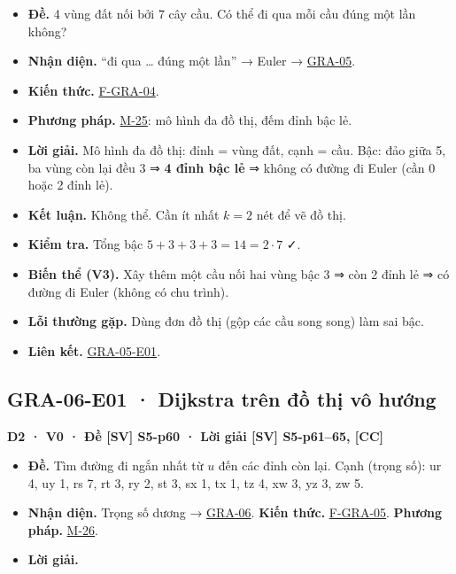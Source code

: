 \documentclass[
  10pt,
  twoside,openany]{book}
\providecommand{\tightlist}{%
  \setlength{\itemsep}{0pt}\setlength{\parskip}{0pt}}
\begin{document}
\begin{itemize}
\tightlist
\item
  \textbf{Đề.} 4 vùng đất nối bởi 7 cây cầu. Có thể đi qua mỗi cầu đúng
  một lần không?
\item
  \textbf{Nhận diện.} ``đi qua \ldots{} đúng một lần'' → Euler →
  \protect\hyperlink{GRA-05}{GRA-05}.
\item
  \textbf{Kiến thức.} \protect\hyperlink{F-GRA-04}{F-GRA-04}.
\item
  \textbf{Phương pháp.} \protect\hyperlink{M-25}{M-25}: mô hình đa đồ
  thị, đếm đỉnh bậc lẻ.
\item
  \textbf{Lời giải.} Mô hình đa đồ thị: đỉnh = vùng đất, cạnh = cầu.
  Bậc: đảo giữa 5, ba vùng còn lại đều 3 ⇒ \textbf{4 đỉnh bậc lẻ} ⇒
  không có đường đi Euler (cần 0 hoặc 2 đỉnh lẻ).
\item
  \textbf{Kết luận.} Không thể. Cần ít nhất \(k=2\) nét để vẽ đồ thị.
\item
  \textbf{Kiểm tra.} Tổng bậc \(5+3+3+3=14=2\cdot7\) ✓.
\item
  \textbf{Biến thể (V3).} Xây thêm một cầu nối hai vùng bậc 3 ⇒ còn 2
  đỉnh lẻ ⇒ có đường đi Euler (không có chu trình).
\item
  \textbf{Lỗi thường gặp.} Dùng đơn đồ thị (gộp các cầu song song) làm
  sai bậc.
\item
  \textbf{Liên kết.} \protect\hyperlink{GRA-05-E01}{GRA-05-E01}.
\end{itemize}

\hypertarget{GRA-06-E01}{%
\subsection{GRA-06-E01 · Dijkstra trên đồ thị vô
hướng}\label{GRA-06-E01}}

\textbf{D2 · V0 · Đề {[}SV{]} S5-p60 · Lời giải {[}SV{]} S5-p61--65,
{[}CC{]}}

\begin{itemize}
\tightlist
\item
  \textbf{Đề.} Tìm đường đi ngắn nhất từ \(u\) đến các đỉnh còn lại.
  Cạnh (trọng số): ur 4, uy 1, rs 7, rt 3, ry 2, st 3, sx 1, tx 1, tz 4,
  xw 3, yz 3, zw 5.
\item
  \textbf{Nhận diện.} Trọng số dương →
  \protect\hyperlink{GRA-06}{GRA-06}. \textbf{Kiến thức.}
  \protect\hyperlink{F-GRA-05}{F-GRA-05}. \textbf{Phương pháp.}
  \protect\hyperlink{M-26}{M-26}.
\item
  \textbf{Lời giải.}
\end{itemize}
\end{document}
